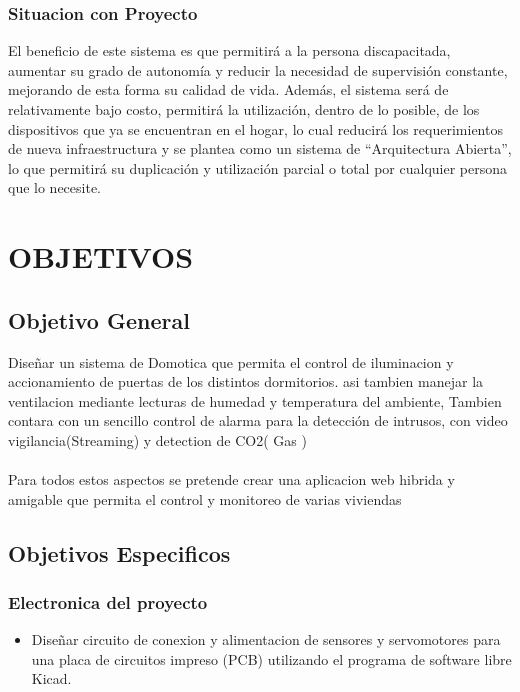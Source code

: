\documentclass[letterpaper,12pt]{article}
\begin{document}
{\subsubsection{Situacion con Proyecto}
El beneficio de este sistema es que permitirá a la persona discapacitada, aumentar su grado de autonomía y reducir la necesidad de supervisión constante, mejorando de esta forma su calidad de vida.  Además, el sistema será de relativamente bajo costo, permitirá la utilización, dentro de lo posible, de los dispositivos que ya se encuentran en el hogar, lo cual reducirá los requerimientos de nueva infraestructura y se plantea como un sistema de “Arquitectura Abierta”, lo que permitirá su duplicación y  utilización parcial o total por cualquier persona que lo necesite. 




\section{OBJETIVOS}




\subsection{Objetivo General}

Diseñar un sistema de Domotica que permita el control de  iluminacion y accionamiento de puertas de los distintos dormitorios.
asi tambien manejar la ventilacion mediante lecturas de humedad y temperatura del ambiente, Tambien contara con un sencillo control de alarma para la detección de intrusos, con video vigilancia(Streaming)  y detection de CO2( Gas )\\\\
Para todos estos aspectos se pretende crear una aplicacion web hibrida y amigable que permita el control y monitoreo de varias viviendas


\subsection{Objetivos Especificos}

\subsubsection{Electronica del proyecto}

\begin{itemize}
	
	\item Diseñar circuito de conexion y alimentacion de sensores y servomotores para una placa de circuitos impreso (PCB) utilizando el programa de software libre Kicad.
	

\end{itemize}}
\end{document}
